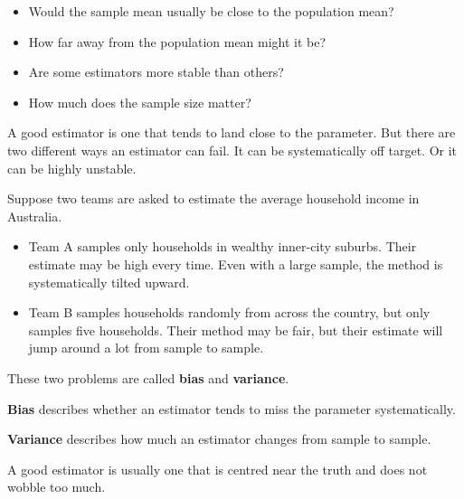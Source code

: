 \documentclass[
  letterpaper,
  DIV=11,
  numbers=noendperiod]{scrreprt}
\providecommand{\tightlist}{%
  \setlength{\itemsep}{0pt}\setlength{\parskip}{0pt}}
\begin{document}
\begin{itemize}
\tightlist
\item
  Would the sample mean usually be close to the population mean?
\item
  How far away from the population mean might it be?
\item
  Are some estimators more stable than others?
\item
  How much does the sample size matter?
\end{itemize}

A good estimator is one that tends to land close to the parameter. But
there are two different ways an estimator can fail. It can be
systematically off target. Or it can be highly unstable.

Suppose two teams are asked to estimate the average household income in
Australia.

\begin{itemize}
\item
  Team A samples only households in wealthy inner-city suburbs. Their
  estimate may be high every time. Even with a large sample, the method
  is systematically tilted upward.
\item
  Team B samples households randomly from across the country, but only
  samples five households. Their method may be fair, but their estimate
  will jump around a lot from sample to sample.
\end{itemize}

These two problems are called \textbf{bias} and \textbf{variance}.

\begin{tcolorbox}[enhanced jigsaw, arc=.35mm, bottomrule=.15mm, bottomtitle=1mm, breakable, colback=white, colbacktitle=quarto-callout-note-color!10!white, colframe=quarto-callout-note-color-frame, coltitle=black, left=2mm, leftrule=.75mm, opacityback=0, opacitybacktitle=0.6, rightrule=.15mm, title=\textcolor{quarto-callout-note-color}{\faInfo}\hspace{0.5em}{Terminology: bias and variance}, titlerule=0mm, toprule=.15mm, toptitle=1mm]

\textbf{Bias} describes whether an estimator tends to miss the parameter
systematically.

\textbf{Variance} describes how much an estimator changes from sample to
sample.

A good estimator is usually one that is centred near the truth and does
not wobble too much.

\end{tcolorbox}
\end{document}
